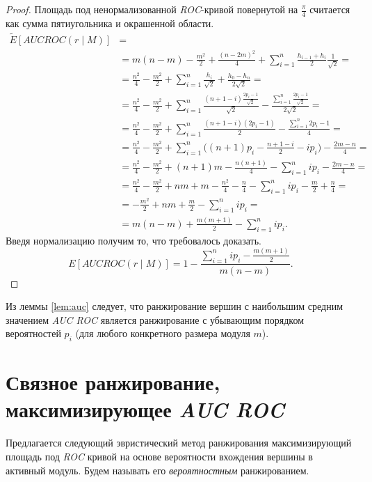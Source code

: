 \begin{proof}
    Площадь под ненормализованной \emph{ROC}-кривой  повернутой на
    $\frac{\pi}{4}$ считается как сумма пятиугольника и окрашенной области.
    \begin{align*}
        \tilde{E}[AUC ROC(r \mid M)] &=\\
        &= m(n-m) - \frac{m^2}{2}+\frac{(n-2m)^2}{4} + 
            \sum_{i=1}^{n} \frac{h_{i-1}+h_{i}}{2}\frac{1}{\sqrt{2}} = \\
        &= \frac{n^2}{4} - \frac{m^2}{2} +
            \sum_{i=1}^{n} \frac{h_i}{\sqrt{2}} + \frac{h_0 - h_n}{2\sqrt{2}} = \\
        &= \frac{n^2}{4} - \frac{m^2}{2} +
            \sum_{i=1}^{n} \frac{(n+1-i)\frac{2p_i-1}{\sqrt{2}}}{\sqrt{2}} - \frac{\sum_{i=1}^{n} \frac{2p_i-1}{\sqrt{2}}}{2\sqrt{2}} = \\
        &= \frac{n^2}{4} - \frac{m^2}{2} +
            \sum_{i=1}^{n} \frac{(n+1-i)(2p_i-1)}{2} - \frac{\sum_{i=1}^{n} 2p_i-1}{4} = \\
        &= \frac{n^2}{4} - \frac{m^2}{2} +
            \sum_{i=1}^{n} \bigg((n+1)p_i - \frac{n+1-i}{2} -ip_i\bigg)- \frac{2m-n}{4} = \\
        &= \frac{n^2}{4} - \frac{m^2}{2} +
            (n+1)m - \frac{n(n+1)}{4} - \sum_{i=1}^{n}ip_i -\frac{2m-n}{4} = \\
        &= \frac{n^2}{4} - \frac{m^2}{2} +
            nm + m - \frac{n^2}{4} - \frac{n}{4} - \sum_{i=1}^{n}ip_i -\frac{m}{2} + \frac{n}{4} = \\
        &=  - \frac{m^2}{2} +
            nm + \frac{m}{2} - \sum_{i=1}^{n}ip_i = \\
        &=  m(n-m) + \frac{m(m+1)}{2} - \sum_{i=1}^{n}ip_i.
    \end{align*}
    Введя нормализацию получим то, что требовалось доказать.
    \[E[AUC ROC(r \mid M)] = 1 - \frac{\sum_{i=1}^{n}ip_i - \frac{m(m+1)}{2}}{m(n-m)}.\]
\end{proof}

Из леммы \ref{lem:auc} следует, что ранжирование вершин с наибольшим средним
значением \emph{AUC ROC} является ранжирование с убывающим порядком
вероятностей $p_i$ (для любого конкретного размера модуля $m$).





\section{Связное ранжирование, максимизирующее \emph{AUC ROC}}
Предлагается следующий эвристический метод ранжирования максимизирующий площадь
под \emph{ROC} кривой на основе вероятности вхождения вершины в активный модуль.
Будем называть его \emph{вероятностным} ранжированием.

